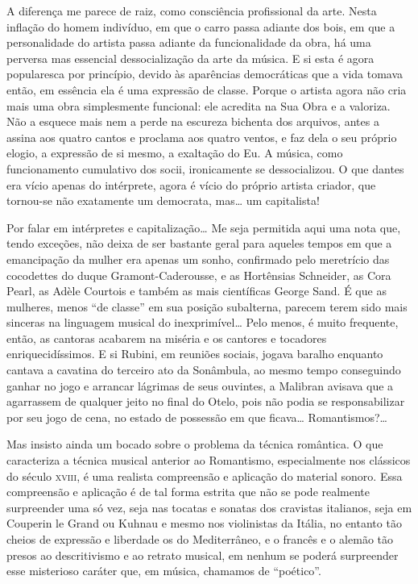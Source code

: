 A diferença me parece de raiz, como consciência profissional da arte.
Nesta inflação do homem indivíduo, em que o carro passa adiante dos
bois, em que a personalidade do artista passa adiante da funcionalidade
da obra, há uma perversa mas essencial dessocialização da arte da
música. E si esta é agora popularesca por princípio, devido às
aparências democráticas que a vida tomava então, em essência ela é uma
expressão de classe. Porque o artista agora não cria mais uma obra
simplesmente funcional: ele acredita na Sua Obra e a valoriza. Não a
esquece mais nem a perde na escureza bichenta dos arquivos, antes a
assina aos quatro cantos e proclama aos quatro ventos, e faz dela o seu
próprio elogio, a expressão de si mesmo, a exaltação do Eu. A música,
como funcionamento cumulativo dos socii, ironicamente se dessocializou.
O que dantes era vício apenas do intérprete, agora é vício do próprio
artista criador, que tornou-se não exatamente um democrata, mas\ldots{} um
capitalista!

Por falar em intérpretes e capitalização\ldots{} Me seja permitida aqui uma
nota que, tendo exceções, não deixa de ser bastante geral para aqueles
tempos em que a emancipação da mulher era apenas um sonho, confirmado
pelo meretrício das cocodettes do duque Gramont-Caderousse, e as
Hortênsias Schneider, as Cora Pearl, as Adèle Courtois e também as mais
científicas George Sand. É que as mulheres, menos ``de classe'' em sua
posição subalterna, parecem terem sido mais sinceras na linguagem
musical do inexprimível\ldots{} Pelo menos, é muito frequente, então, as
cantoras acabarem na miséria e os cantores e tocadores
enriquecidíssimos. E si Rubini, em reuniões sociais, jogava baralho
enquanto cantava a cavatina do terceiro ato da Sonâmbula, ao mesmo tempo
conseguindo ganhar no jogo e arrancar lágrimas de seus ouvintes, a
Malibran avisava que a agarrassem de qualquer jeito no final do Otelo,
pois não podia se responsabilizar por seu jogo de cena, no estado de
possessão em que ficava\ldots{} Romantismos?\ldots{}

Mas insisto ainda um bocado sobre o problema da técnica romântica. O que
caracteriza a técnica musical anterior ao Romantismo, especialmente nos
clássicos do século \textsc{xviii}, é uma realista compreensão e aplicação do
material sonoro. Essa compreensão e aplicação é de tal forma estrita que
não se pode realmente surpreender uma só vez, seja nas tocatas e sonatas
dos cravistas italianos, seja em Couperin le Grand ou Kuhnau e mesmo nos
violinistas da Itália, no entanto tão cheios de expressão e liberdade os
do Mediterrâneo, e o francês e o alemão tão presos ao descritivismo e ao
retrato musical, em nenhum se poderá surpreender esse misterioso caráter
que, em música, chamamos de ``poético''.

